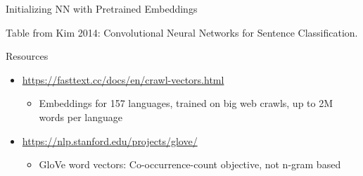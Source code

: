 
\begin{vbframe}{Initializing NN with Pretrained Embeddings}

\vfill


Table from Kim 2014: Convolutional Neural Networks for Sentence Classification.

\vfill

\end{vbframe}


\begin{vbframe}{Resources}

\vfill

\begin{itemize}
	\item \url{https://fasttext.cc/docs/en/crawl-vectors.html}
		\begin{itemize}
			\item Embeddings for 157 languages, trained on big web crawls, up to 2M words per language
		\end{itemize}
	\item \url{https://nlp.stanford.edu/projects/glove/}
		\begin{itemize}
			\item GloVe word vectors: Co-occurrence-count objective, not n-gram based
		\end{itemize}
\end{itemize}

\vfill

\end{vbframe}


